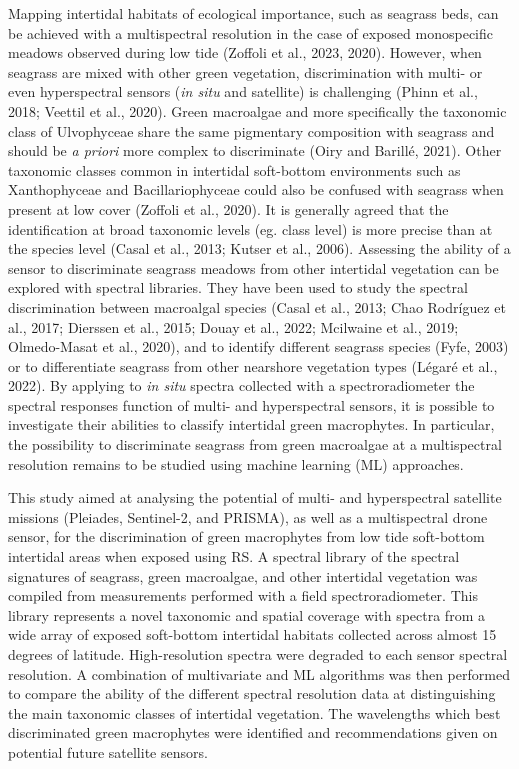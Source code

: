\documentclass[
  letterpaper,
  11pt,
  english,
  singlespacing,
  headsepline]{MastersDoctoralThesis}
\begin{document}
\begin{spacing}{1.5}
Mapping intertidal habitats of ecological importance, such as seagrass
beds, can be achieved with a multispectral resolution in the case of
exposed monospecific meadows observed during low tide (Zoffoli et al.,
2023, 2020). However, when seagrass are mixed with other green
vegetation, discrimination with multi- or even hyperspectral sensors
(\emph{in situ} and satellite) is challenging (Phinn et al., 2018;
Veettil et al., 2020). Green macroalgae and more specifically the
taxonomic class of Ulvophyceae share the same pigmentary composition
with seagrass and should be \emph{a priori} more complex to discriminate
(Oiry and Barillé, 2021). Other taxonomic classes common in intertidal
soft-bottom environments such as Xanthophyceae and Bacillariophyceae
could also be confused with seagrass when present at low cover (Zoffoli
et al., 2020). It is generally agreed that the identification at broad
taxonomic levels (eg. class level) is more precise than at the species
level (Casal et al., 2013; Kutser et al., 2006). Assessing the ability
of a sensor to discriminate seagrass meadows from other intertidal
vegetation can be explored with spectral libraries. They have been used
to study the spectral discrimination between macroalgal species (Casal
et al., 2013; Chao Rodríguez et al., 2017; Dierssen et al., 2015; Douay
et al., 2022; Mcilwaine et al., 2019; Olmedo-Masat et al., 2020), and to
identify different seagrass species (Fyfe, 2003) or to differentiate
seagrass from other nearshore vegetation types (Légaré et al., 2022). By
applying to \emph{in situ} spectra collected with a spectroradiometer
the spectral responses function of multi- and hyperspectral sensors, it
is possible to investigate their abilities to classify intertidal green
macrophytes. In particular, the possibility to discriminate seagrass
from green macroalgae at a multispectral resolution remains to be
studied using machine learning (ML) approaches.

This study aimed at analysing the potential of multi- and hyperspectral
satellite missions (Pleiades, Sentinel-2, and PRISMA), as well as a
multispectral drone sensor, for the discrimination of green macrophytes
from low tide soft-bottom intertidal areas when exposed using RS. A
spectral library of the spectral signatures of seagrass, green
macroalgae, and other intertidal vegetation was compiled from
measurements performed with a field spectroradiometer. This library
represents a novel taxonomic and spatial coverage with spectra from a
wide array of exposed soft-bottom intertidal habitats collected across
almost 15 degrees of latitude. High-resolution spectra were degraded to
each sensor spectral resolution. A combination of multivariate and ML
algorithms was then performed to compare the ability of the different
spectral resolution data at distinguishing the main taxonomic classes of
intertidal vegetation. The wavelengths which best discriminated green
macrophytes were identified and recommendations given on potential
future satellite sensors.


\end{spacing}
\end{document}
